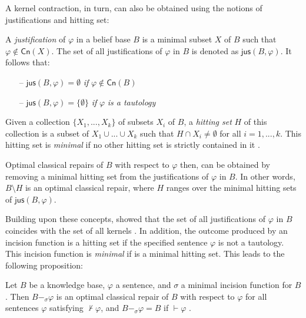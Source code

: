 A kernel contraction, in turn, can also be obtained using the notions of justifications and hitting set:
\begin{definition}
    A \textit{justification} of $\varphi$ in a belief base $B$ is a minimal subset $X$ of $B$ such that $\varphi \notin \textsf{Cn}(X)$. The set of all justifications of $\varphi$ in $B$ is denoted as $\textsf{jus}(B, \varphi)$. It follows that:

    \begin{itemize}
        \item[--] $\textsf{jus}(B, \varphi) = \emptyset$  \textit{if} $\varphi \notin \textsf{Cn}(B)$
        \item[--] $\textsf{jus}(B, \varphi) = \{ \emptyset \}$  \textit{if} $\varphi$  \textit{is a tautology}
    \end{itemize}
\end{definition}

\begin{definition}
    Given a collection $\{ X_1, ..., X_k \}$ of subsets $X_i$ of $B$, a \textit{hitting set} $H$ of this collection is a subset of $X_1 \cup ... \cup X_k$ such that $H \cap X_i \neq \emptyset$ for all $i = 1, ..., k$. This hitting set is \textit{minimal} if no other hitting set is strictly contained in it \citep{Baader-SAC23}.
\end{definition}

Optimal classical repairs of $B$ with respect to $\varphi$ then, can be obtained by removing a minimal hitting set from the justifications of $\varphi$ in $B$. In other words, $B \setminus H$ is an optimal classical repair, where $H$ ranges over the minimal hitting sets of $\textsf{jus}(B, \varphi)$.

Building upon these concepts, \citeauthor{Matos2021} showed that the set of all justifications of $\varphi$ in $B$ coincides with the set of all kernels \citep{Matos2021}. In addition, the outcome produced by an incision function is a hitting set if the specified sentence $\varphi$ is not a tautology. This incision function is \textit{minimal} if is a minimal hitting set. This leads to the following proposition:

\begin{proposition}
    Let $B$ be a knowledge base, $\varphi$ a sentence, and $\sigma$ a minimal incision function for $B$. Then $B -_{\sigma} \varphi$ is an optimal classical repair of $B$ with respect to $\varphi$ for all sentences $\varphi$ satisfying $\nvdash \varphi$, and $B -_{\sigma} \varphi = B$  if $\vdash \varphi$ \citep{Baader-SAC23}.
\end{proposition}

